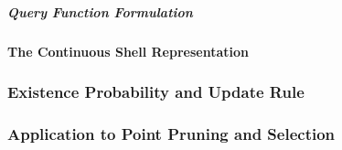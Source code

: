 \subparagraph{Query Function Formulation}

\paragraph{The Continuous Shell Representation}


\subsubsection{Existence Probability and Update Rule}
\label{sec:existence_confidence}

\subsubsection{Application to Point Pruning and Selection}
